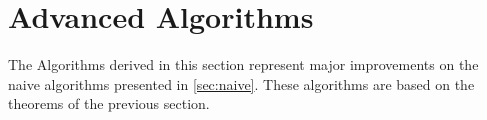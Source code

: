 \section{Advanced Algorithms}
The Algorithms derived in this section represent major improvements on the naive algorithms presented in \ref{sec:naive}. These algorithms are based on the theorems of the previous section.



